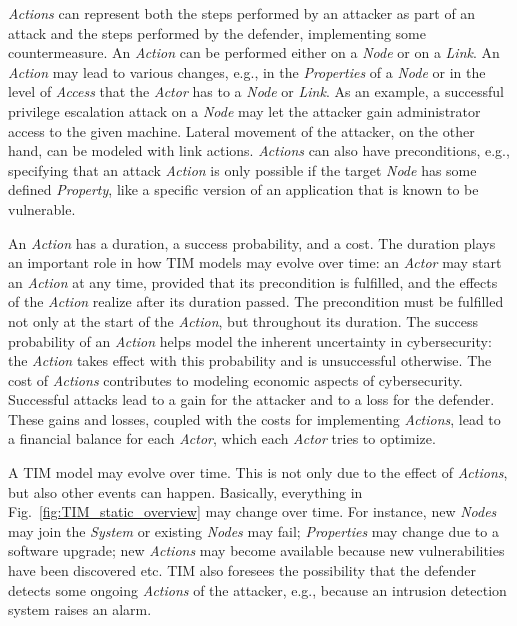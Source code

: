 \documentclass{llncs}
\begin{document}
\emph{Actions} %
can represent both the steps performed by an attacker as part of an attack and the steps performed by the defender, implementing some countermeasure.
An \emph{Action} can be performed either on a \emph{Node} or on a \emph{Link}.
An \emph{Action} may lead to various changes, e.g., in the \emph{Properties} of a \emph{Node} or in the level of \emph{Access} that the \emph{Actor} has to a \emph{Node} or \emph{Link}.
As an example, a successful privilege escalation attack on a \emph{Node} may let the attacker gain administrator access to the given machine.
Lateral movement of the attacker, on the other hand, can be modeled with link actions.
\emph{Actions} can also have preconditions, e.g., specifying that an attack \emph{Action} is only possible if the target \emph{Node} has some defined \emph{Property}, like a specific version of an application that is known to be vulnerable.

An \emph{Action} has a duration, a success probability, and a cost.
The duration plays an important role in how TIM models may evolve over time: an \emph{Actor} may start an \emph{Action} at any time, provided that its precondition is fulfilled, and the effects of the \emph{Action} realize after its duration passed.
The precondition must be fulfilled not only at the start of the \emph{Action}, but throughout its duration.
The success probability of an \emph{Action} helps model the inherent uncertainty in cybersecurity: the \emph{Action} takes effect with this probability and is unsuccessful otherwise.
The cost of \emph{Actions} contributes to modeling economic aspects of cybersecurity.
Successful attacks lead to a gain for the attacker and to a loss for the defender.
These gains and losses, coupled with the costs for implementing \emph{Actions}, lead to a financial balance for each \emph{Actor}, which each \emph{Actor} tries to optimize.

A TIM model may evolve over time.
This is not only due to the effect of \emph{Actions}, but also other events can happen.
Basically, everything in Fig.\ \ref{fig:TIM_static_overview} may change over time.
For instance, new \emph{Nodes} may join the \emph{System} or existing \emph{Nodes} may fail; \emph{Properties} may change due to a software upgrade; new \emph{Actions} may become available because new vulnerabilities have been discovered etc.
TIM also foresees the possibility that the defender detects some ongoing \emph{Actions} of the attacker, e.g., because an intrusion detection system raises an alarm.
\end{document}
